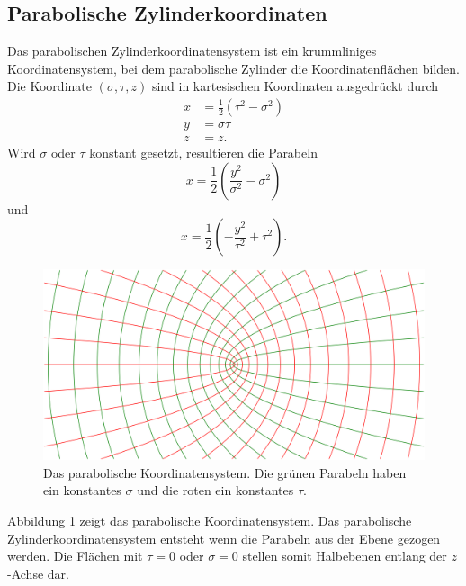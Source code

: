 \subsection{Parabolische Zylinderkoordinaten
\label{parzyl:subsection:finibus}}
Das parabolischen Zylinderkoordinatensystem \cite{parzyl:coordinates} ist ein krummliniges Koordinatensystem, 
bei dem parabolische Zylinder die Koordinatenflächen bilden.
Die Koordinate $(\sigma, \tau, z)$ sind in kartesischen Koordinaten ausgedrückt durch
\begin{align}
    x & = \frac{1}{2}\left(\tau^2 - \sigma^2\right) \\
    \label{parzyl:coordRelationsa}
    y & =  \sigma \tau\\
    z & = z.
    \label{parzyl:coordRelationse}
\end{align}
Wird $\sigma$ oder $\tau$ konstant gesetzt, resultieren die Parabeln
\begin{equation}
    x = \frac{1}{2} \left( \frac{y^2}{\sigma^2} - \sigma^2 \right)
\end{equation}
und 
\begin{equation}
    x = \frac{1}{2} \left( -\frac{y^2}{\tau^2} + \tau^2 \right).
\end{equation}

\begin{figure}
    \centering
    \includegraphics[scale=0.32]{papers/parzyl/img/coordinates.png}
    \caption{Das parabolische Koordinatensystem. Die grünen Parabeln haben ein 
    konstantes $\sigma$ und die roten ein konstantes $\tau$.}
    \label{parzyl:fig:cordinates}
\end{figure}
Abbildung \ref{parzyl:fig:cordinates} zeigt das parabolische Koordinatensystem.
Das parabolische Zylinderkoordinatensystem entsteht wenn die Parabeln aus der
Ebene gezogen werden. 
Die Flächen mit $\tau = 0$ oder $\sigma = 0$ stellen somit Halbebenen entlang der $z$-Achse dar.


